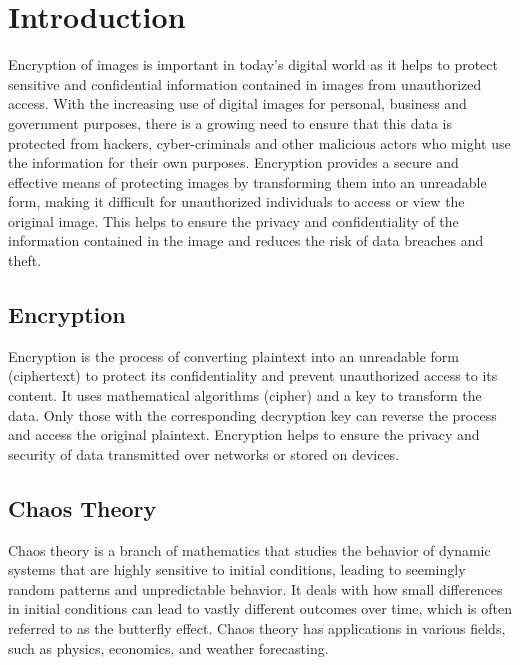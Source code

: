 \documentclass[11pt,a4paper,english]{article}
\begin{document}
\section{Introduction}
Encryption of images is important in today's digital world as it helps to protect sensitive and confidential information contained in images from unauthorized access. With the increasing use of digital images for personal, business and government purposes, there is a growing need to ensure that this data is protected from hackers, cyber-criminals and other malicious actors who might use the information for their own purposes. Encryption provides a secure and effective means of protecting images by transforming them into an unreadable form, making it difficult for unauthorized individuals to access or view the original image. This helps to ensure the privacy and confidentiality of the information contained in the image and reduces the risk of data breaches and theft.
\subsection{Encryption}
Encryption is the process of converting plaintext into an unreadable form (ciphertext) to protect its confidentiality and prevent unauthorized access to its content. It uses mathematical algorithms (cipher) and a key to transform the data. Only those with the corresponding decryption key can reverse the process and access the original plaintext. Encryption helps to ensure the privacy and security of data transmitted over networks or stored on devices.
\subsection{Chaos Theory}
Chaos theory is a branch of mathematics that studies the behavior of dynamic systems that are highly sensitive to initial conditions, leading to seemingly random patterns and unpredictable behavior. It deals with how small differences in initial conditions can lead to vastly different outcomes over time, which is often referred to as the butterfly effect. Chaos theory has applications in various fields, such as physics, economics, and weather forecasting.
\end{document}
